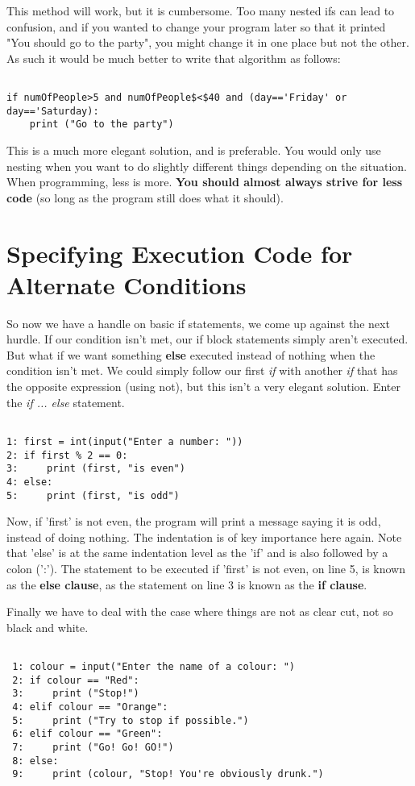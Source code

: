 This method will work, but it is cumbersome. Too many nested ifs can lead to confusion, and if you wanted to change your program later so that it printed "You should go to the party", you might change it in one place but not the other. As such it would be much better to write that algorithm as follows:
\begin{lstlisting}

if numOfPeople>5 and numOfPeople$<$40 and (day=='Friday' or day=='Saturday):
	print ("Go to the party")
		\end{lstlisting}

 This is a much more elegant solution, and is preferable. You would only use nesting when you want to do slightly different things depending on the situation. When programming, less is more. \textbf{You should almost always strive for less code} (so long as the program still does what it should).



\section{Specifying Execution Code for Alternate Conditions}

So now we have a handle on basic if statements, we come up against   the next hurdle. If our condition isn't met, our if block statements   simply aren't executed. But what if we want something   \textbf{else} executed instead of nothing when the condition   isn't met. We could simply follow our first \textit{if} with another \textit{if} that has the opposite expression (using not), but this isn't a very elegant solution. Enter the \textit{if ... else} statement.
\begin{lstlisting}

1: first = int(input("Enter a number: "))
2: if first % 2 == 0:
3:     print (first, "is even")
4: else:
5:     print (first, "is odd")
\end{lstlisting}

Now, if 'first' is not even, the program will print a message saying   it is odd, instead of doing nothing. The indentation is of key   importance here again. Note that 'else' is at the same indentation   level as the 'if' and is also followed by a colon (':'). The statement   to be executed if 'first' is not even, on line 5, is known as the   \textbf{else clause}, as the statement on line 3 is known as   the \textbf{if clause}.

Finally we have to deal with the case where things are not as clear   cut, not so black and white.
\begin{lstlisting}

 1: colour = input("Enter the name of a colour: ")
 2: if colour == "Red":
 3:     print ("Stop!")
 4: elif colour == "Orange":
 5:     print ("Try to stop if possible.")
 6: elif colour == "Green":
 7:     print ("Go! Go! GO!")
 8: else:
 9:     print (colour, "Stop! You're obviously drunk.")
\end{lstlisting}

